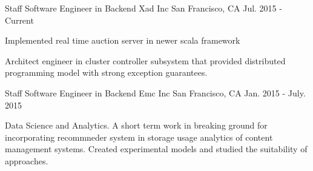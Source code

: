 

\begin{cventries}

  \cventry
    {Staff Software Engineer in Backend } %
    {Xad Inc} %
    {San Francisco, CA} %
    {Jul. 2015 - Current} %
    {
      \begin{cvitems} %
        \item {Implemented real time auction server in newer scala framework} 
        \item {Architect engineer in cluster controller subsystem that provided distributed programming model with strong exception guarantees.}
      \end{cvitems}
    }

  \cventry
    {Staff Software Engineer in Backend } %
    {Emc Inc} %
    {San Francisco, CA} %
    {Jan. 2015 - July. 2015} %
    {
      \begin{cvitems} %
        \item {Data Science and Analytics. A short term work in  breaking ground for incorporating recommneder system in storage usage analytics of content management systems. Created experimental models and studied the suitability of approaches.}
      \end{cvitems}
    }




\end{cventries}
